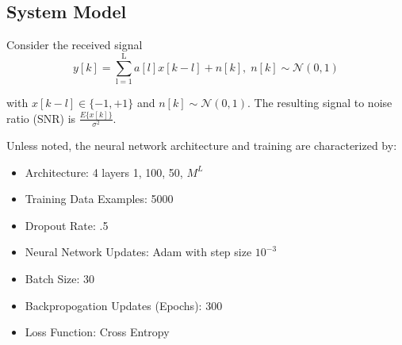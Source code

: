 \documentclass[12pt,a4paper]{report}
\begin{document}
\subsection{System Model}
Consider the received signal 
\begin{equation}
y[k] = \sum_{\mathrm{l=1}}^{\mathrm{L}} a[l]x[k-l] + n[k], \; n[k]  \sim \mathcal{N}(0,1)
\end{equation}

with $x[k-l] \in \{ -1, +1\}$ and $n[k]  \sim \mathcal{N}(0,1)$.  
The resulting signal to noise ratio (SNR) is 
$\frac{E\{x[k]\}}{\sigma^2}$.

Unless noted, the neural network architecture and training are characterized by:
\begin{itemize}
\item Architecture: 4 layers {1, 100, 50, $M^L$}
\item Training Data Examples: 5000
\item Dropout Rate: .5
\item Neural Network Updates: Adam with step size $10^{-3}$ \cite{kingma2014adam}
\item Batch Size: 30 
\item Backpropogation Updates (Epochs): 300
\item Loss Function: Cross Entropy
\end{itemize}
\end{document}
